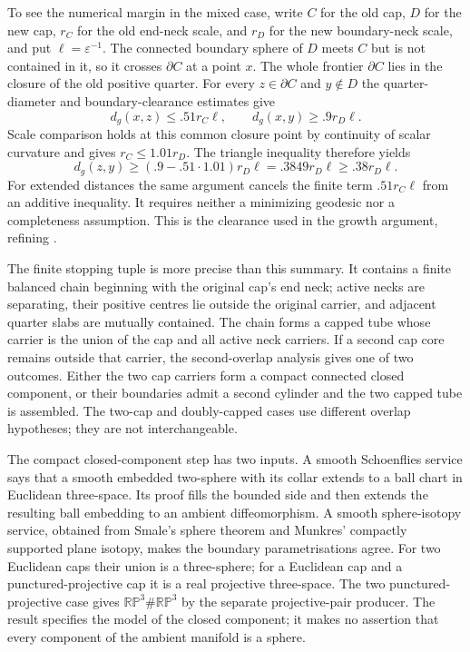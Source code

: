 To see the numerical margin in the mixed case, write $C$ for the old cap,
$D$ for the new cap, $r_C$ for the old end-neck scale, and $r_D$ for the
new boundary-neck scale, and put $\ell=\varepsilon^{-1}$.  The connected
boundary sphere of $D$ meets
$C$ but is not contained in it, so it crosses $\partial C$ at a point
$x$.  The whole frontier $\partial C$ lies in the closure of the old
positive quarter.  For every $z\in\partial C$ and $y\notin D$ the
quarter-diameter and boundary-clearance estimates give
\[
 d_g(x,z)\le .51r_C\ell,\qquad d_g(x,y)\ge .9r_D\ell.
\]
Scale comparison holds at this common closure point by continuity of
scalar curvature and gives $r_C\le1.01r_D$.  The triangle inequality
therefore yields
\[
 d_g(z,y)\ge(.9-.51\cdot1.01)r_D\ell
             =.3849r_D\ell\ge.38r_D\ell.
\]
For extended distances the same argument cancels the finite term
$.51r_C\ell$ from an additive inequality.  It requires neither a minimizing
geodesic nor a completeness assumption.  This is the clearance used in
the growth argument, refining \cite[Claim A.22, pp.~509--510]{MT2007}.

The finite stopping tuple is more precise than this summary.  It contains a
finite balanced chain beginning with the original cap's end neck; active necks
are separating, their positive centres lie outside the original carrier, and
adjacent quarter slabs are mutually contained.  The chain forms a capped tube
whose carrier is the union of the cap and all active neck carriers.  If a
second cap core remains outside that carrier, the second-overlap analysis gives
one of two outcomes.  Either the two cap carriers form a compact connected
closed component, or their boundaries admit a second cylinder and the two
capped tube is assembled.  The two-cap and doubly-capped cases use different
overlap hypotheses; they are not interchangeable.

The compact closed-component step has two inputs.  A smooth Schoenflies
service says that a smooth embedded two-sphere with its collar extends to a
ball chart in Euclidean three-space.  Its proof fills the bounded side and
then extends the resulting ball embedding to an ambient diffeomorphism.  A
smooth sphere-isotopy service, obtained from Smale's sphere theorem and
Munkres' compactly supported plane isotopy, makes the boundary parametrisations
agree.  For two Euclidean caps their union is a three-sphere; for a Euclidean
cap and a punctured-projective cap it is a real projective three-space.  The
two punctured-projective case gives
$\mathbb{RP}^3\#\mathbb{RP}^3$ by the separate projective-pair producer.  The
result specifies the model of the closed component; it makes no assertion
that every component of the ambient manifold is a sphere.

